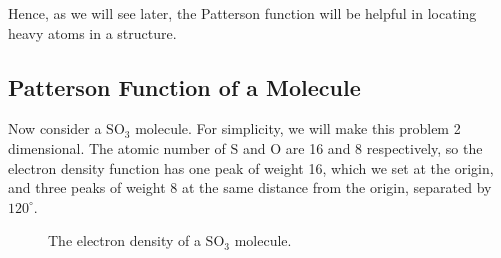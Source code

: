 \documentclass{article}
\theoremstyle{plain}\theoremheaderfont{\normalfont\itshape}\theorembodyfont{\rmfamily}\theoremseparator{.}\newtheorem*{rem}{Remark}\newtheorem*{ex}{Example}\newtheorem*{proof}{Proof}\newtheorem*{altp}{Alternative proof}
\theoremstyle{plain}\theoremheaderfont{\normalfont\bfseries}\theorembodyfont{\rmfamily}\theoremseparator{.}\newtheorem{thm}{Theorem}[section]\newtheorem{lem}[thm]{Lemma}\newtheorem{prop}[thm]{Proposition}\newtheorem*{cor}{Corollary}\newtheorem{defn}[thm]{Definition}\newtheorem{clm}[thm]{Claim}\newtheorem{clminproof}{Claim}\newtheorem*{law}{Law}\newtheorem{pos}[thm]{Postulate}
\theoremstyle{break}\theoremheaderfont{\normalfont\itshape}\theorembodyfont{\rmfamily}\theoremseparator{.\medskip}\newtheorem*{proofskip}{Proof}\newtheorem*{exs}{Examples}\newtheorem*{rems}{Remarks}
\theoremstyle{break}\theoremheaderfont{\normalfont\bfseries}\theorembodyfont{\rmfamily}\theoremseparator{.\medskip}\newtheorem{lemskip}[thm]{Lemma}\newtheorem{defnskip}[thm]{Definition}\newtheorem{propskip}[thm]{Proposition}\newtheorem{thmskip}[thm]{Theorem}
\numberwithin{equation}{section}
\begin{document}
    Hence, as we will see later, the Patterson function will be helpful in locating heavy atoms in a structure.

    \subsection{Patterson Function of a Molecule}
    Now consider a \(\mathrm{SO_3}\) molecule. For simplicity, we will make this problem 2 dimensional. The atomic number of \(\mathrm{S}\) and \(\mathrm{O}\) are 16 and 8 respectively, so the electron density function has one peak of weight 16, which we set at the origin, and three peaks of weight 8 at the same distance from the origin, separated by \(120^\circ\).

    \begin{figure}[ht!]
        \centering
        \caption{The electron density of a \(\mathrm{SO_3}\) molecule.}
    \end{figure}
\end{document}
